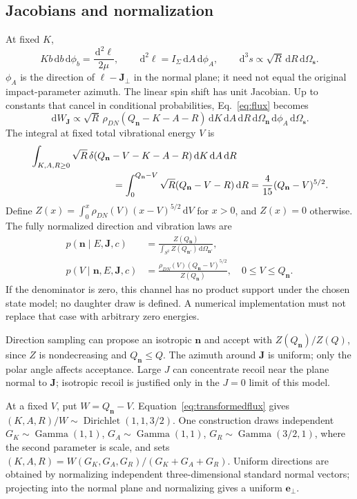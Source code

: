 \documentclass[10pt,a4paper]{article}
\newcommand{\dd}{\,\mathrm d}
\newcommand{\Dir}{\operatorname{Dirichlet}}
\begin{document}
\clearpage
\subsection{Jacobians and normalization}
At fixed $K$,
\[
 Kb\dd b\dd\phi_b=\frac{\dd^2\ell}{2\mu},\qquad
 \dd^2\ell=I_\Sigma\dd A\dd\phi_A,\qquad
 \dd^3s\propto\sqrt R\dd R\dd\Omega_{\mathbf s}.
\]
$\phi_A$ is the direction of $\boldsymbol\ell-\mathbf J_\perp$ in the
normal plane; it need not equal the original impact-parameter azimuth.
The linear spin shift has unit Jacobian. Up to constants that cancel in
conditional probabilities, Eq.~\eqref{eq:flux} becomes
\begin{equation}
 \dd W_{\mathbf J}\propto
 \sqrt R\,\rho_{DN}(Q_{\mathbf n}-K-A-R)
 \dd K\dd A\dd R\dd\Omega_{\mathbf n}\dd\phi_A\dd\Omega_{\mathbf s}.
 \label{eq:transformedflux}
\end{equation}
The integral at fixed total vibrational energy $V$ is
\begin{align}
 &\int_{K,A,R\geq0}\sqrt R\,
 \delta(Q_{\mathbf n}-V-K-A-R)\dd K\dd A\dd R\notag\\
 &\hspace{3cm}=\int_0^{Q_{\mathbf n}-V}\sqrt R
 (Q_{\mathbf n}-V-R)\dd R
 =\frac4{15}(Q_{\mathbf n}-V)^{5/2}.
\end{align}
Define $Z(x)=\int_0^x\rho_{DN}(V)(x-V)^{5/2}\dd V$ for $x>0$,
and $Z(x)=0$ otherwise. The fully normalized direction and vibration laws are
\begin{align}
 p(\mathbf n\mid E,\mathbf J,c)&=
 \frac{Z(Q_{\mathbf n})}{\int_{S^2}Z(Q_{\mathbf n'})\dd\Omega_{\mathbf n'}},
 \label{eq:ndir}\\
 p(V\mid\mathbf n,E,\mathbf J,c)&=
 \frac{\rho_{DN}(V)(Q_{\mathbf n}-V)^{5/2}}{Z(Q_{\mathbf n})},
 \quad0\leq V\leq Q_{\mathbf n}.
 \label{eq:vprod}
\end{align}
If the denominator is zero, this channel has no product support under the
chosen state model; no daughter draw is defined. A numerical implementation
must not replace that case with arbitrary zero energies.

Direction sampling can propose an isotropic $\mathbf n$ and accept with
$Z(Q_{\mathbf n})/Z(Q)$, since $Z$ is nondecreasing and
$Q_{\mathbf n}\leq Q$. The azimuth around $\mathbf J$ is uniform; only the
polar angle affects acceptance. Large $J$ can concentrate recoil near the
plane normal to $\mathbf J$; isotropic recoil is justified only in the
$J=0$ limit of this model.

At a fixed $V$, put $W=Q_{\mathbf n}-V$. Equation~\eqref{eq:transformedflux}
gives $(K,A,R)/W\sim\Dir(1,1,3/2)$. One construction draws independent
$G_K\sim\operatorname{Gamma}(1,1)$, $G_A\sim\operatorname{Gamma}(1,1)$,
$G_R\sim\operatorname{Gamma}(3/2,1)$, where the second parameter is scale,
and sets $(K,A,R)=W(G_K,G_A,G_R)/(G_K+G_A+G_R)$.
Uniform directions are obtained by normalizing independent three-dimensional
standard normal vectors; projecting into the normal plane and normalizing
gives a uniform $\mathbf e_\perp$.
\end{document}
